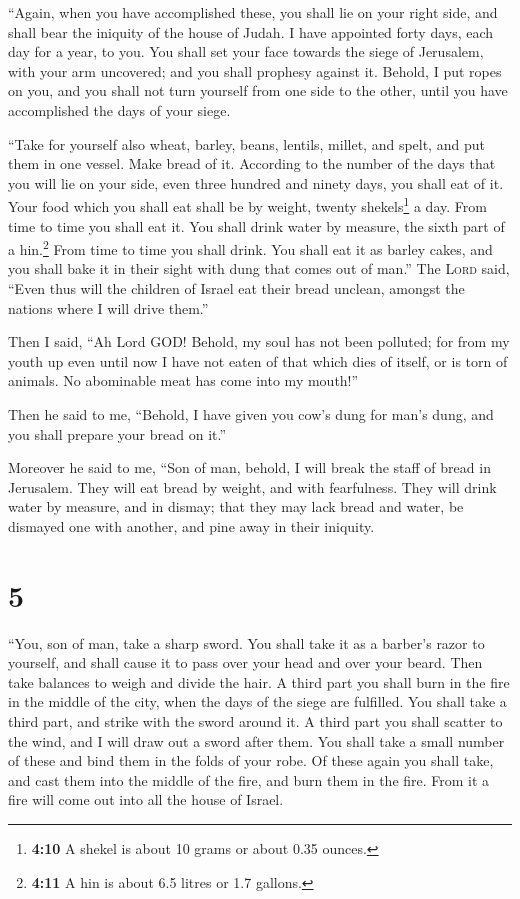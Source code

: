  ``Again, when you have accomplished these, you shall lie
on your right side, and shall bear the iniquity of the house of Judah. I
have appointed forty days, each day for a year, to you. 
You shall set your face towards the siege of Jerusalem, with your arm
uncovered; and you shall prophesy against it.  Behold, I
put ropes on you, and you shall not turn yourself from one side to the
other, until you have accomplished the days of your siege.

 ``Take for yourself also wheat, barley, beans, lentils,
millet, and spelt, and put them in one vessel. Make bread of it.
According to the number of the days that you will lie on your side, even
three hundred and ninety days, you shall eat of it.  Your
food which you shall eat shall be by weight, twenty shekels\footnote{\textbf{4:10}
  A shekel is about 10 grams or about 0.35 ounces.} a day. From time to
time you shall eat it.  You shall drink water by measure,
the sixth part of a hin.\footnote{\textbf{4:11} A hin is about 6.5
  litres or 1.7 gallons.} From time to time you shall drink.
 You shall eat it as barley cakes, and you shall bake it
in their sight with dung that comes out of man.''  The
\textsc{Lord} said, ``Even thus will the children of Israel eat their
bread unclean, amongst the nations where I will drive them.''

 Then I said, ``Ah Lord GOD! Behold, my soul has not been
polluted; for from my youth up even until now I have not eaten of that
which dies of itself, or is torn of animals. No abominable meat has come
into my mouth!''

 Then he said to me, ``Behold, I have given you cow's
dung for man's dung, and you shall prepare your bread on it.''

 Moreover he said to me, ``Son of man, behold, I will
break the staff of bread in Jerusalem. They will eat bread by weight,
and with fearfulness. They will drink water by measure, and in dismay;
 that they may lack bread and water, be dismayed one with
another, and pine away in their iniquity.

\hypertarget{section-4}{%
\section{5}\label{section-4}}

 ``You, son of man, take a sharp sword. You shall take it
as a barber's razor to yourself, and shall cause it to pass over your
head and over your beard. Then take balances to weigh and divide the
hair.  A third part you shall burn in the fire in the
middle of the city, when the days of the siege are fulfilled. You shall
take a third part, and strike with the sword around it. A third part you
shall scatter to the wind, and I will draw out a sword after them.
 You shall take a small number of these and bind them in
the folds of your robe.  Of these again you shall take,
and cast them into the middle of the fire, and burn them in the fire.
From it a fire will come out into all the house of Israel.

